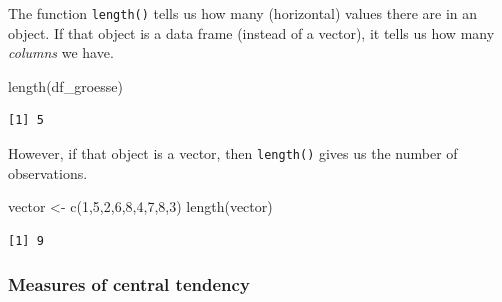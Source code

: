 \documentclass[
  letterpaper,
  DIV=11,
  numbers=noendperiod]{scrartcl}
\newenvironment{Shaded}{\begin{snugshade}}{\end{snugshade}}
\newcommand{\DecValTok}[1]{\textcolor[rgb]{0.68,0.00,0.00}{#1}}
\newcommand{\FunctionTok}[1]{\textcolor[rgb]{0.28,0.35,0.67}{#1}}
\newcommand{\NormalTok}[1]{\textcolor[rgb]{0.00,0.23,0.31}{#1}}
\newcommand{\OtherTok}[1]{\textcolor[rgb]{0.00,0.23,0.31}{#1}}
\begin{document}
\begin{tcolorbox}[enhanced jigsaw, colframe=quarto-callout-note-color-frame, rightrule=.15mm, breakable, coltitle=black, opacityback=0, leftrule=.75mm, colback=white, toprule=.15mm, opacitybacktitle=0.6, colbacktitle=quarto-callout-note-color!10!white, bottomrule=.15mm, toptitle=1mm, left=2mm, titlerule=0mm, arc=.35mm, title=\textcolor{quarto-callout-note-color}{\faInfo}\hspace{0.5em}{\texttt{length()} versus \texttt{nrow()}}, bottomtitle=1mm]

The function \texttt{length()} tells us how many (horizontal) values
there are in an object. If that object is a data frame (instead of a
vector), it tells us how many \emph{columns} we have.

\begin{Shaded}
\begin{Highlighting}[]
\FunctionTok{length}\NormalTok{(df\_groesse)}
\end{Highlighting}
\end{Shaded}

\begin{verbatim}
[1] 5
\end{verbatim}

However, if that object is a vector, then \texttt{length()} gives us the
number of observations.

\begin{Shaded}
\begin{Highlighting}[]
\NormalTok{vector }\OtherTok{\textless{}{-}} \FunctionTok{c}\NormalTok{(}\DecValTok{1}\NormalTok{,}\DecValTok{5}\NormalTok{,}\DecValTok{2}\NormalTok{,}\DecValTok{6}\NormalTok{,}\DecValTok{8}\NormalTok{,}\DecValTok{4}\NormalTok{,}\DecValTok{7}\NormalTok{,}\DecValTok{8}\NormalTok{,}\DecValTok{3}\NormalTok{)}
\FunctionTok{length}\NormalTok{(vector)}
\end{Highlighting}
\end{Shaded}

\begin{verbatim}
[1] 9
\end{verbatim}

\end{tcolorbox}

\hypertarget{measures-of-central-tendency}{%
\subsubsection{Measures of central
tendency}\label{measures-of-central-tendency}}
\end{document}
